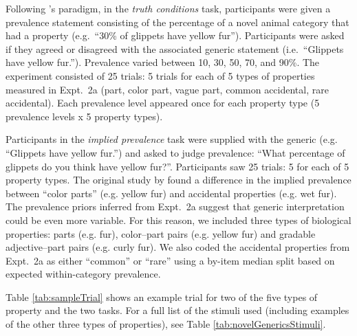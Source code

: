 \documentclass[10pt,letterpaper]{article}
\begin{document}
Following \citeauthor{Cimpian2010}'s paradigm, in the \emph{truth conditions} task, participants were given a prevalence statement consisting of the percentage of a novel animal category that had a property (e.g.~``30\% of glippets have yellow fur''). 
Participants were asked if they agreed or disagreed with the associated generic statement (i.e.~``Glippets have yellow fur.'').
Prevalence varied between 10, 30, 50, 70, and 90\%.
The experiment consisted of 25 trials: 5 trials for each of 5 types of properties measured in Expt.~2a (part, color part, vague part, common accidental, rare accidental). 
Each prevalence level appeared once for each property type (5 prevalence levels x 5 property types). 

Participants in the \emph{implied prevalence} task were supplied with the generic (e.g. ``Glippets have yellow fur.'') and asked to judge prevalence: ``What percentage of glippets do you think have yellow fur?''. Participants saw 25 trials: 5 for each of 5 property types.
The original study by \citeauthor{Cimpian2010} found a difference in the implied prevalence between ``color parts'' (e.g. yellow fur) and accidental properties (e.g. wet fur).
The prevalence priors inferred from Expt.~2a suggest that generic interpretation could be even more variable.
For this reason, we included three types of biological properties: parts (e.g. fur), color--part pairs (e.g. yellow fur) and gradable adjective--part pairs (e.g. curly fur). 
We also coded the accidental properties from Expt.~2a as either ``common'' or ``rare'' using a by-item median split based on expected within-category prevalence.

 
Table \ref{tab:sampleTrial} shows an example trial for two of the five types of property and the two tasks.
For a full list of the stimuli used (including examples of the other three types of properties), see Table \ref{tab:novelGenericsStimuli}.
\end{document}
